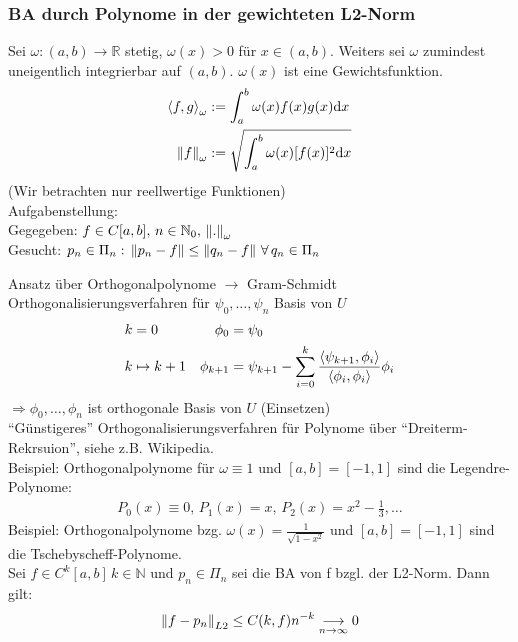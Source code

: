 \subsubsection{BA durch Polynome in der gewichteten L2-Norm}
 Sei $\omega: (a,b)\longrightarrow \mathbb{R}$ stetig, $\omega(x) > 0$ für $x \in (a,b)$.
Weiters sei $\omega$ zumindest uneigentlich integrierbar auf $(a,b)$. $\omega(x)$ ist eine Gewichtsfunktion.
\begin{align*}
  \left\langle f, g \right\rangle_\omega &:= \int_a^b \omega(x) f(x)g(x) \mathrm{d}x\\
  \left\lVert f \right\rVert_\omega &:= \sqrt{\int_a^b \omega(x) [f(x)]^2 \mathrm{d}x}
\end{align*}
(Wir betrachten nur reellwertige Funktionen)\\
Aufgabenstellung:\\
Gegegeben: $f \in C[a,b],\,n \in \mathbb{N}_0,\,\left\lVert . \right\rVert_\omega$\\
Gesucht: $p_n \in \Pi_n:\,\left\lVert p_n - f \right\rVert \leq \left\lVert q_n - f \right\rVert\,\forall\, q_n \in \Pi_n$

Ansatz über Orthogonalpolynome $\rightarrow$ Gram-Schmidt Orthogonalisierungsverfahren
für $\psi_0,\ldots,\psi_n$ Basis von $U$
\begin{align*}
  k &= 0 & \phi_0 &= \psi_0\\
  k &\mapsto k+1 & \phi_{k+1} &= \psi_{k+1} - \sum\limits_{i=0}^{k}{\frac{\left\langle \psi_{k+1}, \phi_i \right\rangle}{\left\langle \phi_i, \phi_i \right\rangle}\phi_i}
\end{align*}
$\Rightarrow \phi_0,\ldots,\phi_n$ ist orthogonale Basis von $U$ (Einsetzen)\\
``Günstigeres'' Orthogonalisierungsverfahren für Polynome über ``Dreiterm-Rekrsuion'', siehe z.B. Wikipedia.\\
Beispiel: Orthogonalpolynome für $\omega \equiv 1$ und $[a,b]=[-1,1]$ sind die Legendre-Polynome:
\begin{align*}
  P_0(x)\equiv 0, \, P_1(x)=x, \, P_2(x)=x^2 - \frac{1}{3},\ldots
\end{align*}
Beispiel: Orthogonalpolynome bzg. $\omega(x)=\frac{1}{\sqrt{1-x^2}}$ und $[a,b]=[-1,1]$ sind die Tschebyscheff-Polynome.\\
 Sei $f \in C^k[a,b]\, k \in \mathbb{N}$ und $p_n \in \Pi_n$ sei die BA von f bzgl. der L2-Norm. Dann gilt:
\begin{align*}
  \left\lVert f-p_n \right\rVert_{L2} \leq C(k,f)n^{-k} \underset{n \to \infty}{\longrightarrow} 0
\end{align*}

